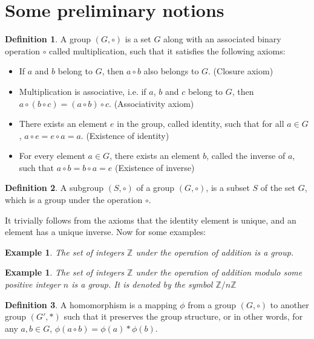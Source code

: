 \documentclass[12pt]{article}
\newtheorem{exmp}[thm]{Example}
\theoremstyle{definition}
\newtheorem{defn}{Definition}[section]
\begin{document}
\section{Some preliminary notions}

\begin{defn}
A group $(G, \circ)$ is a set $G$ along with an associated binary operation $\circ$ called multiplication, such that it satisfies the following axioms:
\begin{itemize}
\item If $a$ and $b$ belong to $G$, then $a \circ b$ also belongs to $G$. (Closure axiom)
\item Multiplication is associative, i.e. if $a$, $b$ and $c$ belong to $G$, then $a \circ (b \circ c) = (a \circ b) \circ c$. (Associativity axiom)
\item There exists an element $e$ in the group, called identity, such that for all $a \in G$, $a \circ e = e \circ a = a$. (Existence of identity)
\item For every element $a \in G$, there exists an element $b$, called the inverse of $a$, such that $a \circ b = b \circ a = e$ (Existence of inverse)
\end{itemize}
\end{defn}

\begin{defn}
A subgroup $(S, \circ)$ of a group $(G, \circ)$, is a subset $S$ of the set $G$, which is a group under the operation $\circ$.
\end{defn}

It trivially follows from the axioms that the identity element is unique, and an element has a unique inverse. Now for some examples:

\begin{exmp}
\label{int}
The set of integers $\mathbb{Z}$ under the operation of addition is a group.
\end{exmp}

\begin{exmp}
\label{int_mod}
The set of integers $\mathbb{Z}$ under the operation of addition modulo some positive integer $n$ is a group. It is denoted by the symbol $\mathbb{Z}/n\mathbb{Z}$
\end{exmp}

\begin{defn}
A homomorphism is a mapping $\phi$ from a group $(G, \circ)$ to another group $(G', *)$ such that it preserves the group structure, or in other words, for any $a,b \in G$, $\phi(a \circ b) = \phi(a) * \phi(b)$.
\end{defn}
\end{document}
